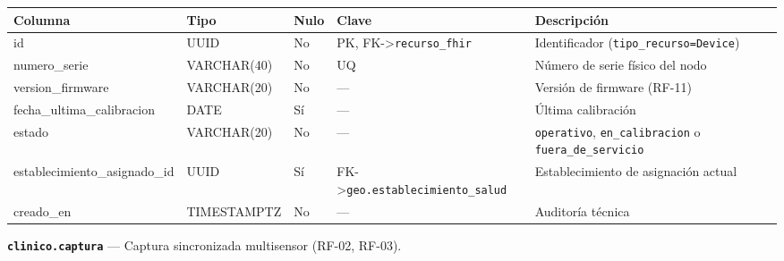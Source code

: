 \documentclass[11pt,a4paper]{article}
\begin{document}
{\small
\begin{longtable}[]{@{}
  >{\raggedright\arraybackslash}p{}
  >{\raggedright\arraybackslash}p{}
  >{\raggedright\arraybackslash}p{}
  >{\raggedright\arraybackslash}p{}
  >{\raggedright\arraybackslash}p{}@{}}
\toprule\noalign{}
\begin{minipage}[b]{\linewidth}\raggedright
Columna
\end{minipage} & \begin{minipage}[b]{\linewidth}\raggedright
Tipo
\end{minipage} & \begin{minipage}[b]{\linewidth}\raggedright
Nulo
\end{minipage} & \begin{minipage}[b]{\linewidth}\raggedright
Clave
\end{minipage} & \begin{minipage}[b]{\linewidth}\raggedright
Descripción
\end{minipage} \\
\midrule\noalign{}
\endhead
\bottomrule\noalign{}
\endlastfoot
id & UUID & No & PK, FK-\textgreater{}\texttt{recurso\_fhir} & Identificador (\texttt{tipo\_recurso=\textquotesingle{}Device\textquotesingle{}}) \\
numero\_serie & VARCHAR(40) & No & UQ & Número de serie físico del nodo \\
version\_firmware & VARCHAR(20) & No & --- & Versión de firmware (RF-11) \\
fecha\_ultima\_calibracion & DATE & Sí & --- & Última calibración \\
estado & VARCHAR(20) & No & --- & \texttt{operativo}, \texttt{en\_calibracion} o \texttt{fuera\_de\_servicio} \\
establecimiento\_asignado\_id & UUID & Sí & FK-\textgreater{}\texttt{geo.establecimiento\_salud} & Establecimiento de asignación actual \\
creado\_en & TIMESTAMPTZ & No & --- & Auditoría técnica \\
\end{longtable}
}

\textbf{\texttt{clinico.captura}} --- Captura sincronizada multisensor (RF-02, RF-03).
\end{document}
